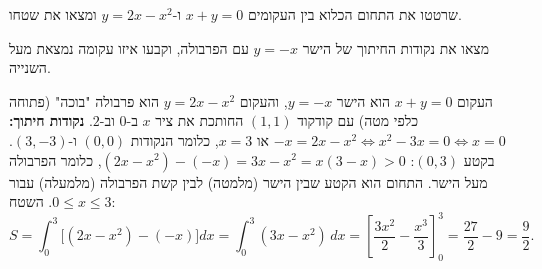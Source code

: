 
\begin{question}
שרטטו את התחום הכלוא בין העקומים $x+y=0$ ו-$y=2x-x^2$ ומצאו את שטחו.
\end{question}

\begin{hint}
מצאו את נקודות החיתוך של הישר $y=-x$ עם הפרבולה, וקבעו איזו עקומה נמצאת מעל השנייה.
\end{hint}

\begin{solution}
העקום $x+y=0$ הוא הישר $y=-x$, והעקום $y=2x-x^2$ הוא פרבולה "בוכה" (פתוחה כלפי מטה) עם קודקוד $(1,1)$ החותכת את ציר $x$ ב-$0$ וב-$2$.
\textbf{נקודות חיתוך:} $-x=2x-x^2\iff x^2-3x=0\iff x=0$ או $x=3$, כלומר הנקודות $(0,0)$ ו-$(3,-3)$.
בקטע $(0,3)$: $(2x-x^2)-(-x)=3x-x^2=x(3-x)>0$, כלומר הפרבולה מעל הישר. התחום הוא הקטע שבין הישר (מלמטה) לבין קשת הפרבולה (מלמעלה) עבור $0\le x\le3$. השטח:
\[ S=\int_0^3\big[(2x-x^2)-(-x)\big]dx=\int_0^3(3x-x^2)\,dx=\left[\frac{3x^2}{2}-\frac{x^3}{3}\right]_0^3=\frac{27}{2}-9=\boxed{\frac92}. \]
\end{solution}
